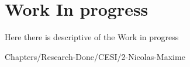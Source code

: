 \chapter{Work In progress}

Here there is descriptive of the Work in progress


{Chapters/Research-Done/CESI/2-Nicolas-Maxime} 